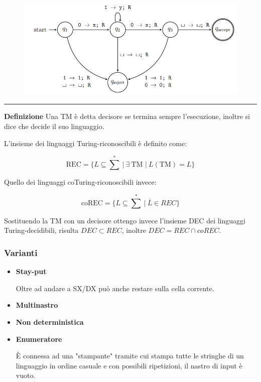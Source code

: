 \documentclass{article}
\begin{document}
\begin{figure}[ht]
    \centering
    \includegraphics[width=0.85\linewidth]{TM.png}
    \label{fig:tm}
\end{figure}

\noindent\rule{\textwidth}{0.5pt}\newline

\noindent\textbf{Definizione} Una TM è detta decisore se termina sempre l'esecuzione, inoltre si dice che decide il suo linguaggio.\newline

\noindent L'insieme dei linguaggi Turing-riconoscibili è definito come:

$$\text{REC}=\{L\subseteq \text{${\sum}^*$}\ |\ \exists\ \text{TM }|\ L(\text{TM})=L\}$$\newline

\noindent Quello dei linguaggi coTuring-riconoscibili invece:

$$\text{coREC}=\{L\subseteq \text{${\sum}^*$}\ |\ \bar{L}\in REC \}$$\newline

\noindent Sostituendo la TM con un decisore ottengo invece l'insieme DEC dei linguaggi Turing-decidibili, risulta $DEC\subset REC$, inoltre $DEC=REC\cap coREC$.

\subsubsection{Varianti}
\begin{itemize}
    \item \textbf{Stay-put}

    Oltre ad andare a SX/DX può anche restare sulla cella corrente.

    \item \textbf{Multinastro}

    \item \textbf{Non deterministica}

    \item \textbf{Enumeratore}

    È connessa ad una "stampante" tramite cui stampa tutte le stringhe di un linguaggio in ordine casuale e con possibili ripetizioni, il nastro di input è vuoto.
    
\end{itemize}
\end{document}
